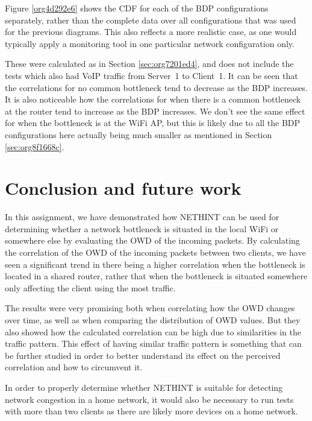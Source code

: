 \documentclass[a4paper,11pt]{article}
\begin{document}
Figure \ref{org4d292e6} shows the CDF for each of the BDP configurations separately, rather than the complete data over all configurations that was used for the previous diagrams. This also reflects a more realistic case, as one would typically apply a monitoring tool in one particular network configuration only.

These were calculated as in Section \ref{sec:org7201ed4}, and does not include the tests which also had VoIP traffic from Server~1 to Client~1. It can be seen that the correlations for no common bottleneck tend to decrease as the BDP increases. It is also noticeable how the correlations for when there is a common bottleneck at the router tend to increase as the BDP increases. We don't see the same effect for when the bottleneck is at the WiFi AP, but this is likely due to all the BDP configurations here actually being much smaller as mentioned in Section \ref{sec:org8f1668c}.
\section{Conclusion and future work}
\label{sec:org28da719}
In this assignment, we have demonstrated how NETHINT can be used for determining whether a network bottleneck is situated in the local WiFi or somewhere else by evaluating the OWD of the incoming packets. By calculating the correlation of the OWD of the incoming packets between two clients, we have seen a significant trend in there being a higher correlation when the bottleneck is located in a shared router, rather that when the bottleneck is situated somewhere only affecting the client using the most traffic.

The results were very promising both when correlating how the OWD changes over time, as well as when comparing the distribution of OWD values. But they also showed how the calculated correlation can be high due to similarities in the traffic pattern. This effect of having similar traffic pattern is something that can be further studied in order to better understand its effect on the perceived correlation and how to circumvent it.

In order to properly determine whether NETHINT is suitable for detecting network congestion in a home network, it would also be necessary to run tests with more than two clients as there are likely more devices on a home network.
\end{document}
